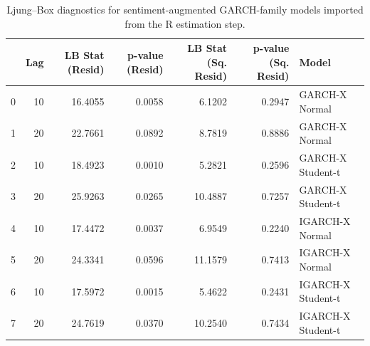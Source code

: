 \begin{table}
\caption{Ljung--Box diagnostics for sentiment-augmented GARCH-family models imported from the R estimation step.}
\label{tab:garch_sentiment_diagnostics}
\begin{tabular}{lrrrrrl}
\toprule
 & Lag & LB Stat (Resid) & p-value (Resid) & LB Stat (Sq. Resid) & p-value (Sq. Resid) & Model \\
\midrule
0 & 10 & 16.4055 & 0.0058 & 6.1202 & 0.2947 & GARCH-X Normal \\
1 & 20 & 22.7661 & 0.0892 & 8.7819 & 0.8886 & GARCH-X Normal \\
2 & 10 & 18.4923 & 0.0010 & 5.2821 & 0.2596 & GARCH-X Student-t \\
3 & 20 & 25.9263 & 0.0265 & 10.4887 & 0.7257 & GARCH-X Student-t \\
4 & 10 & 17.4472 & 0.0037 & 6.9549 & 0.2240 & IGARCH-X Normal \\
5 & 20 & 24.3341 & 0.0596 & 11.1579 & 0.7413 & IGARCH-X Normal \\
6 & 10 & 17.5972 & 0.0015 & 5.4622 & 0.2431 & IGARCH-X Student-t \\
7 & 20 & 24.7619 & 0.0370 & 10.2540 & 0.7434 & IGARCH-X Student-t \\
\bottomrule
\end{tabular}
\end{table}
